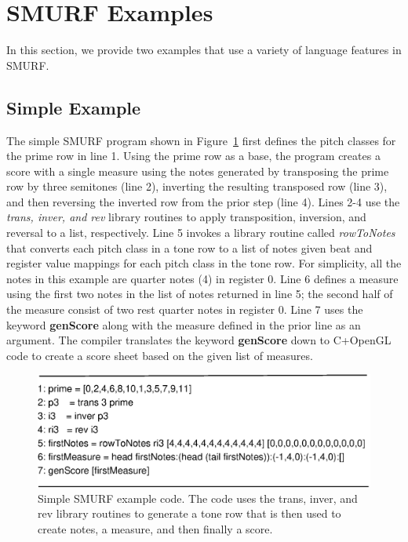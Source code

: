 \section{SMURF Examples}

In this section, we provide two examples that use a variety of language features in SMURF.

\subsection{Simple Example}
The simple SMURF program shown in Figure~\ref{fig:example1} first defines the pitch classes for the prime row in line 1. Using the prime row as a base, the program creates a score with a single measure using the notes generated by transposing the prime row by three semitones (line 2), inverting the resulting transposed row (line 3), and then reversing the inverted row from the prior step (line 4). Lines 2-4 use the \emph{trans, inver, and rev} library routines to apply transposition, inversion, and reversal to a list, respectively. Line 5 invokes a library routine called \emph{rowToNotes} that converts each pitch class in a tone row to a list of notes given beat and register value mappings for each pitch class in the tone row. For simplicity, all the notes in this example are quarter notes (4) in register 0. Line 6 defines a measure using the first two notes in the list of notes returned in line 5; the second half of the measure consist of two rest quarter notes in register 0.  Line 7 uses the keyword \textbf{genScore} along with the measure defined in the prior line as an argument. The compiler translates the keyword \textbf{genScore} down to C+OpenGL code to create a score sheet based on the given list of measures.     

\begin{figure}
  \centering
  \includegraphics[width=\textwidth]{figures/example1}
  \caption{Simple SMURF example code. The code uses the trans, inver, and rev library routines to generate a tone row that is then used to create notes, a measure, and then finally a score.}
  \label{fig:example1}
\end{figure}

